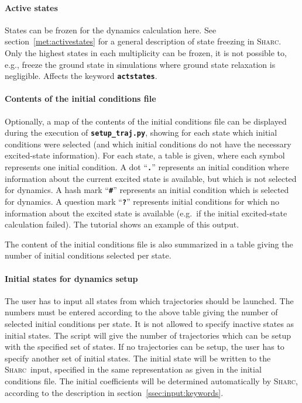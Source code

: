 \documentclass[a4paper,10pt,DIV=15,openany,twoside=false]{scrbook}
\newcommand{\sharc}{\textsc{Sharc}}
\newcommand{\ttt}[1]{\textbf{\texttt{#1}}}
\begin{document}
\paragraph{Active states}

States can be frozen for the dynamics calculation here. See section~\ref{met:activestates} for a general description of state freezing in \sharc. Only the highest states in each multiplicity can be frozen, it is not possible to, e.g., freeze the ground state in simulations where ground state relaxation is negligible. Affects the keyword \ttt{actstates}.

\paragraph{Contents of the initial conditions file}

Optionally, a map of the contents of the initial conditions file can be displayed during the execution of \ttt{setup\_traj.py}, showing for each state which initial conditions were selected (and which initial conditions do not have the necessary excited-state information). For each state, a table is given, where each symbol represents one initial condition. A dot ``\ttt{.}'' represents an initial condition where information about the current excited state is available, but which is not selected for dynamics. A hash mark ``\ttt{\#}'' represents an initial condition which is selected for dynamics. A question mark ``\ttt{?}'' represents initial conditions for which no information about the excited state is available (e.g.\ if the initial excited-state calculation failed). The tutorial shows an example of this output.

The content of the initial conditions file is also summarized in a table giving the number of initial conditions selected per state. 

\paragraph{Initial states for dynamics setup}

The user has to input all states from which trajectories should be launched. The numbers must be entered according to the above table giving the number of selected initial conditions per state. It is not allowed to specify inactive states as initial states. The script will give the number of trajectories which can be setup with the specified set of states. If no trajectories can be setup, the user has to specify another set of initial states. The initial state will be written to the \sharc\ input, specified in the same representation as given in the initial conditions file. The initial coefficients will be determined automatically by \sharc, according to the description in section~\ref{ssec:input:keywords}.
\end{document}
